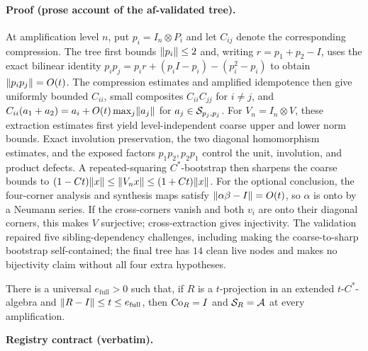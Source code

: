 \paragraph{Proof (prose account of the af-validated tree).}
At amplification level $n$, put $p_i=I_n\otimes P_i$ and let $C_{ij}$ denote the
corresponding compression. The tree first bounds $\lVert p_i\rVert\le2$ and, writing
$r=p_1+p_2-I$, uses the exact bilinear identity
$p_ip_j=p_ir+(p_iI-p_i)-(p_i^2-p_i)$ to obtain $\lVert p_ip_j\rVert=O(t)$.
The compression estimates and amplified idempotence then give uniformly bounded
$C_{ii}$, small composites $C_{ii}C_{jj}$ for $i\ne j$, and
$C_{ii}(a_1+a_2)=a_i+O(t)\max_j\lVert a_j\rVert$ for $a_j\in\mathcal S_{p_j,p_j}$.
For $V_n=I_n\otimes V$, these extraction estimates first yield level-independent
coarse upper and lower norm bounds. Exact involution preservation, the two diagonal
homomorphism estimates, and the exposed factors $p_1p_2,p_2p_1$ control the unit,
involution, and product defects. A repeated-squaring $C^*$-bootstrap then sharpens the
coarse bounds to $(1-Ct)\lVert x\rVert\le\lVert V_nx\rVert\le(1+Ct)\lVert x\rVert$.
For the optional conclusion, the four-corner analysis and synthesis maps satisfy
$\lVert \alpha\beta-I\rVert=O(t)$, so $\alpha$ is onto by a Neumann series. If the cross-corners
vanish and both $v_i$ are onto their diagonal corners, this makes $V$ surjective;
cross-extraction gives injectivity. The validation repaired five sibling-dependency
challenges, including making the coarse-to-sharp bootstrap self-contained; the final
tree has $14$ clean live nodes and makes no bijectivity claim without all four extra hypotheses.

\begin{lemma}\label{lem:maincb-full-corner-identification}
There is a universal $e_{\mathrm{full}}>0$ such that, if $R$ is a $t$-projection in an
extended $t$-$C^*$-algebra and $\lVert R-I\rVert\le t\le e_{\mathrm{full}}$, then
$\mathrm{Co}_{R}=I$ and $\mathcal S_{R}=\mathcal A$ at every amplification.
\end{lemma}
\noindent\textbf{Registry contract (verbatim).}
